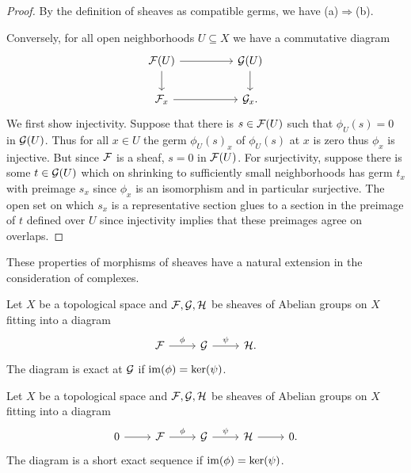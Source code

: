 \begin{proof}
    By the definition of sheaves as compatible germs, we have (a)$\Rightarrow$(b). 

    Conversely, for all open neighborhoods $U\subseteq X$ we have a commutative diagram 
    $$%
    \begin{tikzcd}
        {\Fcal(U)} && {\Gcal(U)} \\
        {\Fcal_{x}} && {\Gcal_{x}.}
        \arrow[from=1-1, to=1-3]
        \arrow[from=1-1, to=2-1]
        \arrow[from=1-3, to=2-3]
        \arrow[from=2-1, to=2-3]
    \end{tikzcd}$$
    We first show injectivity. Suppose that there is $s\in\mathcal{F}(U)$ such that $\phi_{U}(s)=0$ in $\mathcal{G}(U)$. Thus for all $x\in U$ the germ $\phi_{U}(s)_{x}$ of $\phi_{U}(s)$ at $x$ is zero thus $\phi_{x}$ is injective. But since $\mathcal{F}$ is a sheaf, $s=0$ in $\mathcal{F}(U)$. For surjectivity, suppose there is some $t\in\mathcal{G}(U)$ which on shrinking to sufficiently small neighborhoods has germ $t_{x}$ with preimage $s_{x}$ since $\phi_{x}$ is an isomorphism and in particular surjective. The open set on which $s_{x}$ is a representative section glues to a section in the preimage of $t$ defined over $U$ since injectivity implies that these preimages agree on overlaps. 
\end{proof}
These properties of morphisms of sheaves have a natural extension in the consideration of complexes. 
\begin{definition}[Exact]\label{def: exact}
    Let $X$ be a topological space and $\mathcal{F},\mathcal{G},\mathcal{H}$ be sheaves of Abelian groups on $X$ fitting into a diagram 
    $$%
    \begin{tikzcd}
        \Fcal & \Gcal & \Hcal.
        \arrow["\phi", from=1-1, to=1-2]
        \arrow["\psi", from=1-2, to=1-3]
    \end{tikzcd}$$
    The diagram is exact at $\mathcal{G}$ if $\mathrm{im}(\phi)=\ker(\psi)$. 
\end{definition}
\begin{definition}\label{def: short exact sequence}
    Let $X$ be a topological space and $\mathcal{F},\mathcal{G},\mathcal{H}$ be sheaves of Abelian groups on $X$ fitting into a diagram 
    $$%
    \begin{tikzcd}
        0 & \Fcal & \Gcal & \Hcal & 0.
        \arrow[from=1-1, to=1-2]
        \arrow["\phi", from=1-2, to=1-3]
        \arrow["\psi", from=1-3, to=1-4]
        \arrow[from=1-4, to=1-5]
    \end{tikzcd}$$
    The diagram is a short exact sequence if $\mathrm{im}(\phi)=\ker(\psi)$.
\end{definition}
